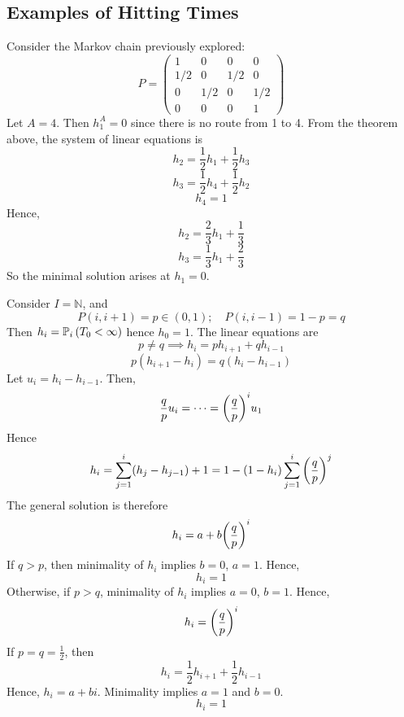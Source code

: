 \subsection{Examples of Hitting Times}
\begin{example}
	Consider the Markov chain previously explored:
	\[
		P = \begin{pmatrix}
			1   & 0   & 0   & 0   \\
			1/2 & 0   & 1/2 & 0   \\
			0   & 1/2 & 0   & 1/2 \\
			0   & 0   & 0   & 1
		\end{pmatrix}
	\]
	Let \( A = \qty{4} \).
	Then \( h_1^A = 0 \) since there is no route from 1 to 4.
	From the theorem above, the system of linear equations is
	\[
		h_2 = \frac{1}{2} h_1 + \frac{1}{2} h_3
	\]
	\[
		h_3 = \frac{1}{2} h_4 + \frac{1}{2} h_2
	\]
	\[
		h_4 = 1
	\]
	Hence,
	\[
		h_2 = \frac{2}{3} h_1 + \frac{1}{3}
	\]
	\[
		h_3 = \frac{1}{3} h_1 + \frac{2}{3}
	\]
	So the minimal solution arises at \( h_1 = 0 \).
\end{example}
\begin{example}
	Consider \( I = \mathbb N \), and
	\[
		P(i, i+1) = p \in (0,1);\quad P(i, i-1) = 1-p = q
	\]
	Then \( h_i = \mathbb{P}_{i}\left({T_0 < \infty}\right) \) hence \( h_0 = 1 \).
	The linear equations are
	\[
		p \neq q \implies h_i = p h_{i+1} + q h_{i-1}
	\]
	\[
		p(h_{i+1} - h_i) = q(h_i - h_{i-1})
	\]
	Let \( u_i = h_i - h_{i-1} \).
	Then,
	\[
		\frac{q}{p} u_i = \dots = \qty(\frac{q}{p})^i u_1
	\]
	Hence
	\[
		h_i = \sum_{j=1}^i (h_j - h_{j-1}) + 1 = 1 - (1-h_i) \sum_{j=1}^i \qty(\frac{q}{p})^j
	\]
	The general solution is therefore
	\[
		h_i = a + b \qty(\frac{q}{p})^i
	\]
	If \( q > p \), then minimality of \( h_i \) implies \( b = 0 \), \( a = 1 \).
	Hence,
	\[
		h_i = 1
	\]
	Otherwise, if \( p > q \), minimality of \( h_i \) implies \( a = 0 \), \( b = 1 \).
	Hence,
	\[
		h_i = \qty(\frac{q}{p})^i
	\]
	If \( p = q = \frac{1}{2} \), then
	\[
		h_i = \frac{1}{2} h_{i+1} + \frac{1}{2} h_{i-1}
	\]
	Hence, \( h_i = a + bi \).
	Minimality implies \( a = 1 \) and \( b = 0 \).
	\[
		h_i = 1
	\]
\end{example}

